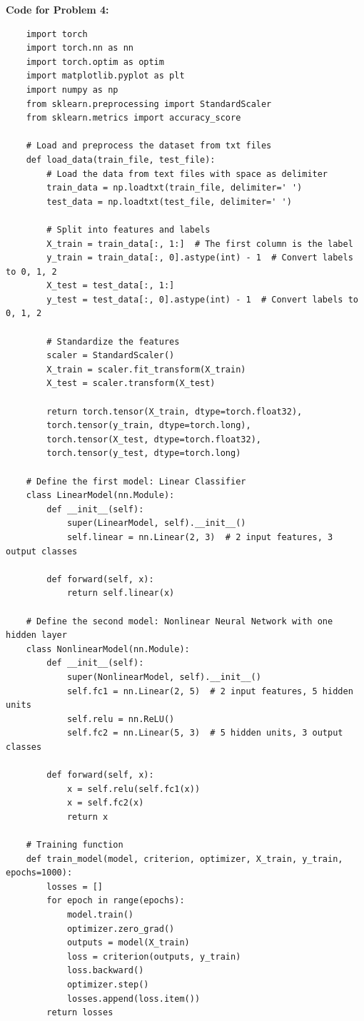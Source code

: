 \documentclass[11pt, oneside]{article}   	%
\begin{document}
\textbf{Code for Problem 4:} \\
\begin{verbatim}
    import torch
    import torch.nn as nn
    import torch.optim as optim
    import matplotlib.pyplot as plt
    import numpy as np
    from sklearn.preprocessing import StandardScaler
    from sklearn.metrics import accuracy_score
    
    # Load and preprocess the dataset from txt files
    def load_data(train_file, test_file):
        # Load the data from text files with space as delimiter
        train_data = np.loadtxt(train_file, delimiter=' ')
        test_data = np.loadtxt(test_file, delimiter=' ')
        
        # Split into features and labels
        X_train = train_data[:, 1:]  # The first column is the label
        y_train = train_data[:, 0].astype(int) - 1  # Convert labels to 0, 1, 2
        X_test = test_data[:, 1:]
        y_test = test_data[:, 0].astype(int) - 1  # Convert labels to 0, 1, 2
        
        # Standardize the features
        scaler = StandardScaler()
        X_train = scaler.fit_transform(X_train)
        X_test = scaler.transform(X_test)
        
        return torch.tensor(X_train, dtype=torch.float32), 
        torch.tensor(y_train, dtype=torch.long), 
        torch.tensor(X_test, dtype=torch.float32), 
        torch.tensor(y_test, dtype=torch.long)
    
    # Define the first model: Linear Classifier
    class LinearModel(nn.Module):
        def __init__(self):
            super(LinearModel, self).__init__()
            self.linear = nn.Linear(2, 3)  # 2 input features, 3 output classes
        
        def forward(self, x):
            return self.linear(x)
    
    # Define the second model: Nonlinear Neural Network with one hidden layer
    class NonlinearModel(nn.Module):
        def __init__(self):
            super(NonlinearModel, self).__init__()
            self.fc1 = nn.Linear(2, 5)  # 2 input features, 5 hidden units
            self.relu = nn.ReLU()
            self.fc2 = nn.Linear(5, 3)  # 5 hidden units, 3 output classes
        
        def forward(self, x):
            x = self.relu(self.fc1(x))
            x = self.fc2(x)
            return x
    
    # Training function
    def train_model(model, criterion, optimizer, X_train, y_train, epochs=1000):
        losses = []
        for epoch in range(epochs):
            model.train()
            optimizer.zero_grad()
            outputs = model(X_train)
            loss = criterion(outputs, y_train)
            loss.backward()
            optimizer.step()
            losses.append(loss.item())
        return losses
    

\end{verbatim}
\end{document}

